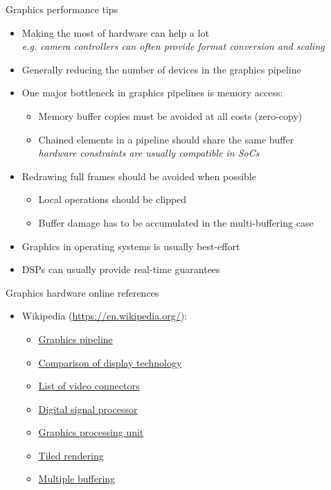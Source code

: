 \begin{frame}{Graphics performance tips}
  \begin{itemize}
  \item Making the most of hardware can help a lot\\
    \textit{e.g. camera controllers can often provide format conversion and scaling}
  \item Generally reducing the number of devices in the graphics pipeline
  \item One major bottleneck in graphics pipelines is memory access:
    \begin{itemize}
    \item Memory buffer copies must be avoided at all costs (zero-copy)
    \item Chained elements in a pipeline should share the same buffer\\
      \textit{hardware constraints are usually compatible in SoCs}
    \end{itemize}
  \item Redrawing full frames should be avoided when possible
    \begin{itemize}
    \item Local operations should be clipped
    \item Buffer damage has to be accumulated in the multi-buffering case
    \end{itemize}
  \item Graphics in operating systems is usually best-effort
  \item DSPs can usually provide real-time guarantees
  \end{itemize}
\end{frame}

\begin{frame}{Graphics hardware online references}
  \small
  \begin{itemize}
  \item Wikipedia (\url{https://en.wikipedia.org/}):
    \begin{itemize}
    \item \href{https://en.wikipedia.org/wiki/Graphics_pipeline}{Graphics pipeline}
    \item \href{https://en.wikipedia.org/wiki/Comparison_of_display_technology}{Comparison of display technology}
    \item \href{https://en.wikipedia.org/wiki/List_of_video_connectors}{List of video connectors}
    \item \href{https://en.wikipedia.org/wiki/Digital_signal_processor}{Digital signal processor}
    \item \href{https://en.wikipedia.org/wiki/Graphics_processing_unit}{Graphics processing unit}
    \item \href{https://en.wikipedia.org/wiki/Tiled_rendering}{Tiled rendering}
    \item \href{https://en.wikipedia.org/wiki/Multiple_buffering}{Multiple buffering}
    \end{itemize}
  \end{itemize}
\end{frame}

